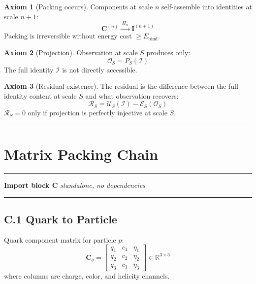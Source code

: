 \documentclass[11pt, a4paper, oneside]{article}
\theoremstyle{definition}
\newtheorem{axiom}{Axiom}[section]
\theoremstyle{plain}
\theoremstyle{remark}
\begin{document}
\begin{axiom}[Packing occurs]
  Components at scale $n$ self-assemble into identities at scale $n+1$:
  \begin{equation}
	\mathbf{C}^{(n)} \xrightarrow{\;\Pi_n\;} \mathbf{I}^{(n+1)}
	\tag{B.3}
  \end{equation}
  Packing is irreversible without energy cost $\geq E_\text{bind}$.
\end{axiom}

\begin{axiom}[Projection]
  Observation at scale $S$ produces only:
  \begin{equation}
	\mathcal{O}_S = P_S(\mathcal{I})
	\tag{B.4}
  \end{equation}
  The full identity $\mathcal{I}$ is not directly accessible.
\end{axiom}

\begin{axiom}[Residual existence]
  The residual is the difference between the full identity content at
  scale $S$ and what observation recovers:
  \begin{equation}
	\mathcal{R}_S = \mathcal{U}_S(\mathcal{I}) - \mathcal{E}_S(\mathcal{O}_S)
	\tag{B.5}
  \end{equation}
  $\mathcal{R}_S = 0$ only if projection is perfectly injective at scale $S$.
\end{axiom}

\noindent\rule{\linewidth}{0.4pt}

\section{Matrix Packing Chain}
\label{sec:packing}

\noindent\rule{\linewidth}{0.8pt}
\textbf{Import block C} \hfill \textit{standalone, no dependencies}
\noindent\rule{\linewidth}{0.4pt}

\subsection*{C.1 Quark to Particle}

Quark component matrix for particle $p$:
\begin{equation}
  \mathbf{C}_q =
  \begin{bmatrix}
	q_1 & c_1 & \eta_1 \\
	q_2 & c_2 & \eta_2 \\
	q_3 & c_3 & \eta_3
  \end{bmatrix}
  \in \mathbb{R}^{3\times 3}
  \tag{C.1}
\end{equation}
where columns are charge, color, and helicity channels.
\end{document}
